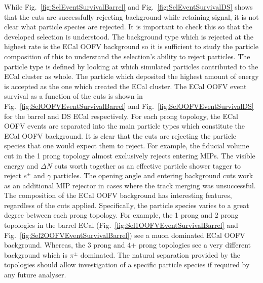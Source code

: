 While Fig.~\ref{fig:SelEventSurvivalBarrel} and Fig.~\ref{fig:SelEventSurvivalDS} shows that the cuts are successfully rejecting background while retaining signal, it is not clear what particle species are rejected.  It is important to check this so that the developed selection is understood.  The background type which is rejected at the highest rate is the ECal OOFV background so it is sufficient to study the particle composition of this to understand the selection's ability to reject particles.  The particle type is defined by looking at which simulated particles contributed to the ECal cluster as whole.  The particle which deposited the highest amount of energy is accepted as the one which created the ECal cluster.  The ECal OOFV event survival as a function of the cuts is shown in Fig.~\ref{fig:SelOOFVEventSurvivalBarrel} and Fig.~\ref{fig:SelOOFVEventSurvivalDS} for the barrel and DS ECal respectively.  For each prong topology, the ECal OOFV events are separated into the main particle types which constitute the ECal OOFV background.  It is clear that the cuts are rejecting the particle species that one would expect them to reject.  For example, the fiducial volume cut in the 1 prong topology almost exclusively rejects entering MIPs.  The visible energy and $\Delta N$ cuts worth together as an effective particle shower tagger to reject $e^\pm$ and $\gamma$ particles.  The opening angle and entering background cuts work as an additional MIP rejector in cases where the track merging was unsuccessful.  The composition of the ECal OOFV background has interesting features, regardless of the cuts applied.  Specifically, the particle species varies to a great degree between each prong topology.  For example, the 1 prong and 2 prong topologies in the barrel ECal (Fig.~\ref{fig:Sel1OOFVEventSurvivalBarrel} and Fig.~\ref{fig:Sel2OOFVEventSurvivalBarrel}) see a muon dominated ECal OOFV background.  Whereas, the 3 prong and 4+ prong topologies see a very different background which is $\pi^\pm$ dominated.  The natural separation provided by the topologies should allow investigation of a specific particle species if required by any future analyser.
